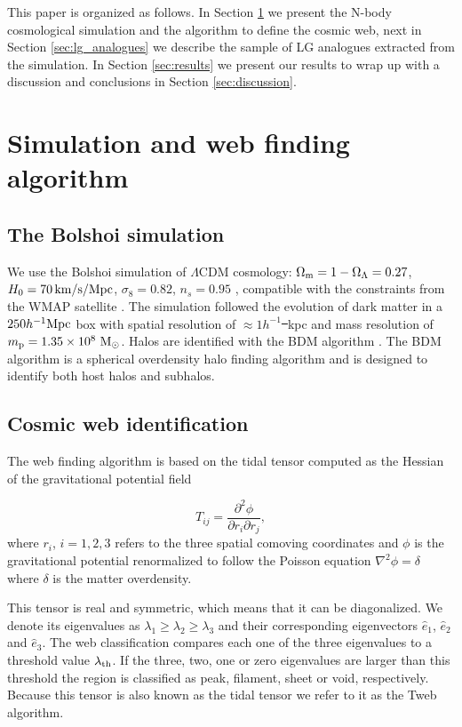 \documentclass{emulateapj}
\newcommand{\manuscript}{paper }
\newcommand{\hmpc}{{\ifmmode{h^{-1}{\rm Mpc}}\else{$h^{-1}$Mpc }\fi}}
\providecommand{\DIFadd}[1]{{\protect\color{blue}\uwave{#1}}} %
\providecommand{\DIFdel}[1]{{\protect\color{red}\sout{#1}}}                      %
\providecommand{\DIFaddbegin}{} %
\providecommand{\DIFaddend}{} %
\providecommand{\DIFdelbegin}{} %
\providecommand{\DIFdelend}{} %
\begin{document}
   
This \manuscript is organized as follows. 
In Section \ref{sec:simulation}
we present the N-body cosmological simulation and the algorithm to
define the cosmic web, next in Section \ref{sec:lg_analogues} we describe the
sample of LG analogues extracted from the simulation. In
Section \ref{sec:results} we present our results to wrap up with a
discussion and conclusions in Section
\ref{sec:discussion}.



\section{Simulation and web finding algorithm}
\label{sec:simulation}

\subsection{The Bolshoi simulation}
We use the Bolshoi simulation of $\Lambda$CDM cosmology: $\Omega_{\rm
  m}=1-\Omega_{\Lambda}=0.27$, $H_0=70\,\rm km/s/Mpc$,
$\sigma_8=0.82$, $n_s=0.95$ \citep{2011ApJ...740..102K}, compatible
with the constraints from the WMAP satellite
\citep{hinshaw_etal13}. The simulation followed the evolution of dark
matter in a $250 \hmpc$ box with spatial resolution of \DIFdelbegin \DIFdel{$\approx
1h^{-1}$~}\DIFdelend \DIFaddbegin \DIFadd{$\sim
1h^{-1}$ }\DIFaddend kpc and mass resolution of $m_{\rm p}=1.35\times 10^8\ \rm
M_{\odot}$. Halos are identified with the BDM algorithm
\citep{1997astro.ph.12217K}. The BDM algorithm is  a spherical
overdensity halo finding algorithm and is designed to identify both
host halos and subhalos. 


\subsection{Cosmic web identification}
The web finding algorithm is based on the tidal tensor computed as the
Hessian of the  gravitational potential field

\begin{equation}
T_{ij} = \frac{\partial^2 \phi}{\partial r_i \partial r_j}, 
\end{equation}
%
where $r_{i}$, $i=1,2,3$ refers to the three spatial comoving
coordinates and $\phi$ is the gravitational potential renormalized to
follow the Poisson equation $\nabla^2\phi=\delta$ where
$\delta$ is the matter overdensity.  

This tensor is real and symmetric, which means that it can be
diagonalized. 
We denote its eigenvalues as $\lambda_1\geq \lambda_2\geq
\lambda_3$ and their corresponding eigenvectors $\hat{e}_1$,
$\hat{e}_2$ and $\hat{e}_3$. 
The web classification compares each one
of the three eigenvalues to a threshold value $\lambda_{\rm th}$. 
If
the three, two, one or zero eigenvalues are larger than this threshold
the region is classified as peak, filament, sheet or void,
respectively.  Because this tensor is also known as the tidal tensor
we refer to it as the Tweb algorithm. 
\end{document}
